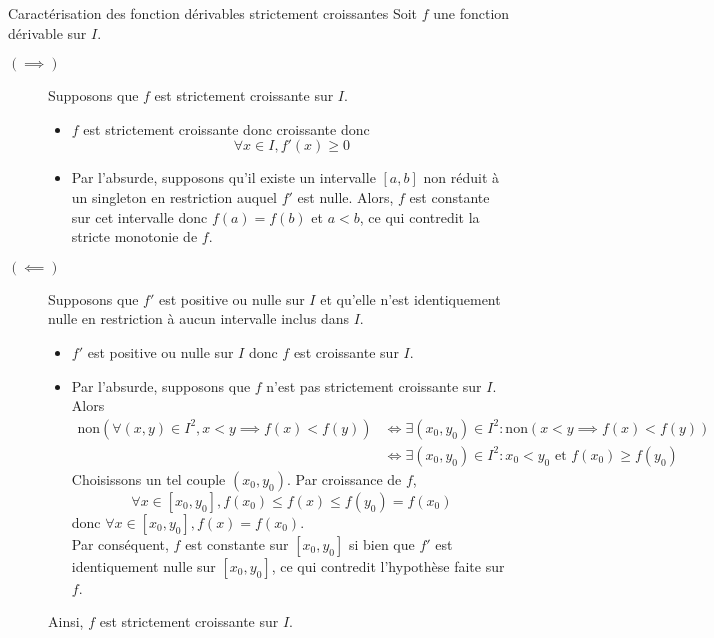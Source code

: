 \documentclass{article}
\date{3 février 2025}
\begin{document}
\maketitle

\begin{question_kholle}{Caractérisation des fonction dérivables strictement croissantes}
	Soit $f$ une fonction dérivable sur $I$.
	\begin{description}
		\item[$(\implies)$] Supposons que $f$ est strictement croissante sur $I$.
		      \begin{itemize}
			      \item $f$ est strictement croissante donc croissante donc
			            \[
				            \forall x\in I, f'(x)\geq 0
			            \]
			      \item Par l’absurde, supposons qu’il existe un intervalle $[a,b]$ non réduit à un singleton en restriction auquel $f'$ est nulle. Alors, $f$ est constante sur cet intervalle donc $f(a)=f(b)$ et $a<b$, ce qui contredit la stricte monotonie de $f$.
		      \end{itemize}
		\item [$(\impliedby )$] Supposons que $f'$ est positive ou nulle sur $I$ et qu’elle n’est identiquement nulle en restriction à aucun intervalle inclus dans $I$.
		      \begin{itemize}
			      \item $f'$ est positive ou nulle sur $I$ donc $f$ est croissante sur $I$.
			      \item Par l’absurde, supposons que $f$ n’est pas strictement croissante sur $I$. Alors
			            \begin{align*}
				            \mathrm{non}(\forall (x,y)\in I^{2}, x<y \implies  f(x)<f(y)) & \iff \exists (x_{0},y_{0})\in I^{2}: \mathrm{non}(x<y \implies f(x)<f(y))          \\
				                                                                          & \iff \exists (x_{0},y_{0})\in I^{2}: x_{0}<y_{0} \text{ et } f(x_{0})\geq f(y_{0})
			            \end{align*}
			            Choisissons un tel couple $(x_{0},y_{0})$. Par croissance de $f$,
			            \[
				            \forall x\in [x_{0},y_{0}], f(x_{0})\leq f(x)\leq f(y_{0})=f(x_{0})
			            \]
			            donc $\forall x\in[x_{0},y_{0}], f(x)=f(x_{0})$.\\
			            Par conséquent, $f$ est constante sur $[x_{0}, y_{0}]$ si bien que $f'$ est identiquement nulle sur $[x_{0}, y_{0}]$, ce qui contredit l’hypothèse faite sur $f$.
		      \end{itemize}
		      Ainsi, $f$ est strictement croissante sur $I$.
	\end{description}
\end{question_kholle}
\end{document}
